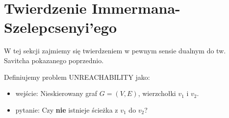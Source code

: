 \section{Twierdzenie Immermana-Szelepcsenyi'ego}

W tej sekcji zajmiemy się twierdzeniem w pewnym sensie dualnym do tw. Savitcha pokazanego poprzednio.

\begin{definition}
	Definiujemy problem \textsc{UNREACHABILITY} jako:
	\begin{itemize}
		\item wejście: Nieskierowany graf \( G = (V, E) \), wierzchołki \(v_1\) i \(v_2\).
		\item pytanie: Czy \textbf{nie} istnieje ścieżka z \(v_1\) do \(v_2\)?
	\end{itemize}
\end{definition}

